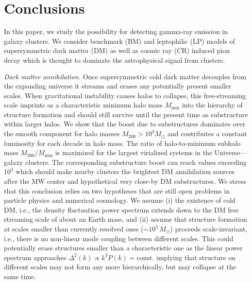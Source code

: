 \documentclass[10pt,aps,pra,reprint,amsmath,amsfonts,amssymb,showpacs,nofootinbib,floatfix]{revtex4-1}
\newcommand{\rmn}{\mathrm}
\newcommand{\msun}{M_\odot}
\newcommand{\mvir}{M_{200}}
\begin{document}
\section{Conclusions}

In this paper, we study the possibility for detecting gamma-ray
emission in galaxy clusters. We consider benchmark (BM) and
leptophilic (LP) models of supersymmetric dark matter (DM) as well as
cosmic ray (CR) induced pion decay which is thought to dominate the
astrophysical signal from clusters. 

{\em Dark matter annihilation.} Once supersymmetric cold dark matter
decouples from the expanding universe it streams and erases any
potentially present smaller scales. When gravitational instability
causes halos to collapse, this free-streaming scale imprints as a
characteristic minimum halo mass $M_\mathrm{min}$ into the hierarchy
of structure formation and should still survive until the present time
as substructure within larger halos. We show that the boost due to
substructures dominates over the smooth component for halo masses
$\mvir>10^3 \msun$ and contributes a constant luminosity for each
decade in halo mass. The ratio of halo-to-minimum subhalo mass
$\mvir/M_\mathrm{min}$ is maximized for the largest virialized systems
in the Universe---galaxy clusters. The corresponding substructure
boost can reach values exceeding $10^3$ which should make nearby
clusters the brightest DM annihilation sources after the MW center and
hypothetical very close-by DM substructures. We stress that this
conclusion relies on two hypotheses that are still open problems in
particle physics and numerical cosmology. We assume (i) the existence
of cold DM, i.e., the density fluctuation power spectrum extends down
to the DM free streaming scale of about an Earth mass, and (ii) assume
that structure formation at scales smaller than currently resolved
ones ($\sim 10^5\,\msun$) proceeds scale-invariant, i.e., there is no
non-linear mode coupling between different scales. This could
potentially erase structures smaller than a characteristic one as the
linear power spectrum approaches $\Delta^2(k) \propto k^3
P(k)=\rmn{const.}$ implying that structure on different scales may not
form any more hierarchically, but may collapse at the same time.
\end{document}
